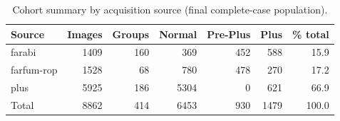 \begin{table}[htbp]
\centering
\small
\caption{Cohort summary by acquisition source (final complete-case population).}
\label{tab:cohort}
\begin{tabular}{lrrrrrr}
\toprule
Source & Images & Groups & Normal & Pre-Plus & Plus & \% total \\
\midrule
farabi & 1409 & 160 & 369 & 452 & 588 & 15.9 \\
farfum-rop & 1528 & 68 & 780 & 478 & 270 & 17.2 \\
plus & 5925 & 186 & 5304 & 0 & 621 & 66.9 \\
Total & 8862 & 414 & 6453 & 930 & 1479 & 100.0 \\
\bottomrule
\end{tabular}
\end{table}

